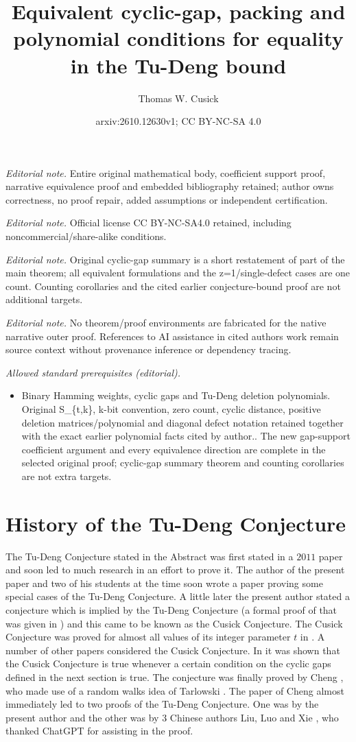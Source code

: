 \documentclass[10pt,a4paper]{article}
\title{Equivalent cyclic-gap, packing and polynomial conditions for equality in the Tu-Deng bound}
\author{Thomas W. Cusick}
\date{arxiv:2610.12630v1; CC BY-NC-SA 4.0}
\begin{document}
\maketitle
\noindent\textit{Editorial note.} Entire original mathematical body, coefficient support proof, narrative equivalence proof and embedded bibliography retained; author owns correctness, no proof repair, added assumptions or independent certification.\par\medskip
\noindent\textit{Editorial note.} Official license CC BY-NC-SA4.0 retained, including noncommercial/share-alike conditions.\par\medskip
\noindent\textit{Editorial note.} Original cyclic-gap summary is a short restatement of part of the main theorem; all equivalent formulations and the z=1/single-defect cases are one count. Counting corollaries and the cited earlier conjecture-bound proof are not additional targets.\par\medskip
\noindent\textit{Editorial note.} No theorem/proof environments are fabricated for the native narrative outer proof. References to AI assistance in cited authors work remain source context without provenance inference or dependency tracing.\par\medskip
\noindent\textit{Allowed standard prerequisites (editorial).}\begin{itemize}
\item Binary Hamming weights, cyclic gaps and Tu-Deng deletion polynomials. Original S\_\{t,k\}, k-bit convention, zero count, cyclic distance, positive deletion matrices/polynomial and diagonal defect notation retained together with the exact earlier polynomial facts cited by author.. The new gap-support coefficient argument and every equivalence direction are complete in the selected original proof; cyclic-gap summary theorem and counting corollaries are not extra targets.
\end{itemize}\medskip
\section{History of the Tu-Deng Conjecture}
The Tu-Deng Conjecture stated in the Abstract was first stated in a $2011$
paper \cite{TuDeng} and soon led to much research in an effort to prove it.
The author of the present paper and two of his students at the time soon 
wrote a paper \cite{CLS} proving some special cases of the Tu-Deng Conjecture.
A little later the present author stated a conjecture which is implied by the
Tu-Deng Conjecture (a formal proof of that was given in \cite{ SpW}) 
and this came to be known as the Cusick Conjecture. The Cusick Conjecture
was proved for almost all values of its integer parameter $t$ in \cite{DKS}. A number 
of other papers considered the Cusick Conjecture. In \cite{SpW2} it was shown
that the Cusick Conjecture is true whenever a certain condition on the cyclic
gaps defined in the next section is true. The conjecture was finally proved by
Cheng \cite{Cheng}, who made use of a random walks idea of Tarlowski \cite{Tar}.
The paper of Cheng almost immediately led to two proofs of the Tu-Deng
Conjecture. One was by the present author \cite{Proof} and the other was by $3$ 
Chinese authors Liu, Luo and Xie \cite{LLX}, who thanked ChatGPT for assisting
in the proof.
 
\end{document}
